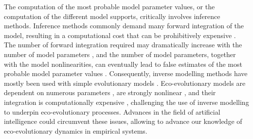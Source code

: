 The computation of the most probable model parameter values, or the computation of the different model supports, critically involves inference methods. %
% 
Inference methods commonly demand many forward integration of the model, resulting in a computational cost that can be prohibitively expensive \citep{Schneider2017}.
% 
The number of forward integration required may dramatically increase with the number of model parameters \citep{Csillery2010}, and the number of model parameters, together with the model nonlinearities, can eventually lead to false estimates of the most probable model parameter values \citep{Gabor2015}.
% 
% 
Consequently, inverse modelling methods have mostly been used with simple evolutionary models \citep{Csillery2010}. 
% 
Eco-evolutionary models are dependent on numerous parameters \citep{Boyd2012}, are strongly nonlinear \citep{Hastings1993,Huisman1999,Beninca2008}, and their integration is computationally expensive \citep{Fisher2018}, challenging the use of inverse modelling to underpin eco-evolutionary processes. 
% 
Advances in the field of artificial intelligence could circumvent these issues, allowing to advance our knowledge of eco-evolutionary dynamics in empirical systems.  
% 
% 
% 
% 

